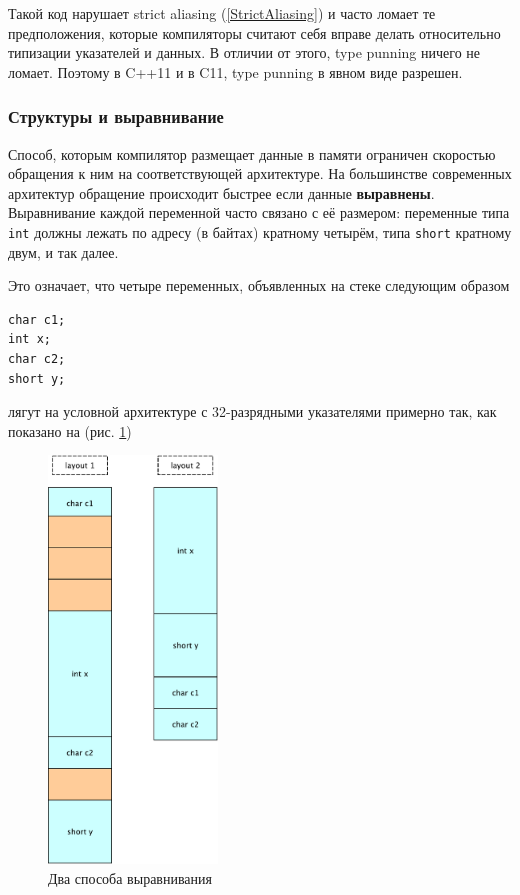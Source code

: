 \documentclass[a4paper,12pt,oneside]{article}
\begin{document}
Такой код нарушает strict aliasing (\ref{StrictAliasing}) и часто ломает те предположения, которые компиляторы считают себя вправе делать относительно типизации указателей и данных. В отличии от этого, type punning ничего не ломает. Поэтому в C++11 и в C11, type punning в явном виде разрешен.

\subsubsection{Структуры и выравнивание}

Способ, которым компилятор размещает данные в памяти ограничен скоростью обращения к ним на соответствующей архитектуре. На большинстве современных архитектур обращение происходит быстрее если данные \textbf{выравнены}. Выравнивание каждой переменной часто связано с её размером: переменные типа \lstinline!int! должны лежать по адресу (в байтах) кратному четырём, типа \lstinline!short! кратному двум, и так далее.

Это означает, что четыре переменных, объявленных на стеке следующим образом

\begin{lstlisting}
char c1;
int x;
char c2;
short y;
\end{lstlisting}

лягут на условной архитектуре с 32-разрядными указателями примерно так, как показано на (рис. \ref{fig:alignment})

\begin{figure}[h!]
\centering
\includegraphics[width=0.4\textwidth]{illustrations/alignment-crop.pdf}
\caption{Два способа выравнивания}
\label{fig:alignment}
\end{figure}
\end{document}
